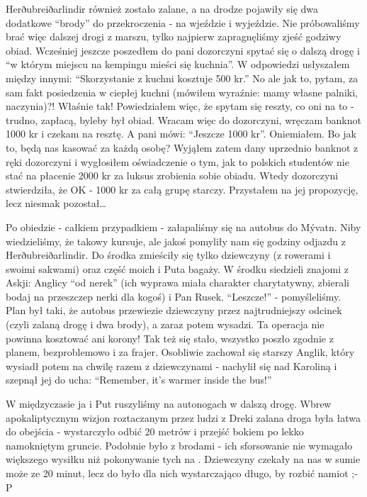 Herðubreiðarlindir również zostało zalane, a na drodze pojawiły się dwa dodatkowe “brody” do przekroczenia - na wjeździe i wyjeździe. Nie próbowaliśmy brać więc dalszej drogi z marszu, tylko najpierw zapragnęliśmy zjeść godziwy obiad. Wcześniej jeszcze poszedłem do pani dozorczyni spytać się o dalszą drogę i “w którym miejscu na kempingu mieści się kuchnia”. W odpowiedzi usłyszałem między innymi: “Skorzystanie z kuchni kosztuje 500 kr.” No ale jak to, pytam, za sam fakt posiedzenia w ciepłej kuchni (mówiłem wyraźnie: mamy własne palniki, naczynia)?! Właśnie tak! Powiedziałem więc, że spytam się reszty, co oni na to - trudno, zapłacą, byleby był obiad. Wracam więc do dozorczyni, wręczam banknot 1000 kr i czekam na resztę. A pani mówi: “Jeszcze 1000 kr”. Oniemiałem. Bo jak to, będą nas kasować za każdą osobę? Wyjąłem zatem dany uprzednio banknot z ręki dozorczyni i wygłosiłem oświadczenie o tym, jak to polskich studentów nie stać na płacenie 2000 kr za luksus zrobienia sobie obiadu. Wtedy dozorczyni stwierdziła, że OK - 1000 kr za całą grupę starczy. Przystałem na jej propozycję, lecz niesmak pozostał…

Po obiedzie - całkiem przypadkiem - załapaliśmy się na autobus do Mývatn. Niby wiedzieliśmy, że takowy kursuje, ale jakoś pomyliły nam się godziny odjazdu z Herðubreiðarlindir. Do środka zmieściły się tylko dziewczyny (z rowerami i swoimi sakwami) oraz część moich i Puta bagaży. W środku siedzieli znajomi z Askji: Anglicy “od nerek” (ich wyprawa miała charakter charytatywny, zbierali bodaj na przeszczep nerki dla kogoś) i Pan Rusek. “Leszcze!” - pomyśleliśmy. Plan był taki, że autobus przewiezie dziewczyny przez najtrudniejszy odcinek (czyli zalaną drogę i dwa brody), a zaraz potem wysadzi. Ta operacja nie powinna kosztować ani korony! Tak też się stało, wszystko poszło zgodnie z planem, bezproblemowo i za frajer. Osobliwie zachował się starszy Anglik, który wysiadł potem na chwilę razem z dziewczynami - nachylił się nad Karoliną i szepnął jej do ucha: “Remember, it’s warmer inside the bus!”

W międzyczasie ja i Put ruszyliśmy na autonogach w dalszą drogę. Wbrew apokaliptycznym wizjon roztaczanym przez ludzi z Dreki zalana droga była łatwa do obejścia - wystarczyło odbić 20 metrów i przejść bokiem po lekko namokniętym gruncie. Podobnie było z brodami - ich sforsowanie nie wymagało większego wysiłku niż pokonywanie tych na . Dziewczyny czekały na nas w sumie może ze 20 minut, lecz do było dla nich wystarczająco długo, by rozbić namiot ;-P

